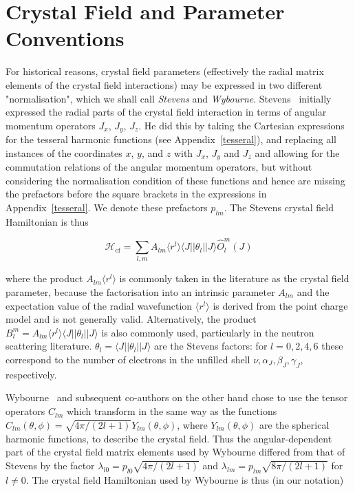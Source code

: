 \section{Crystal Field and Parameter Conventions}\label{cfparconventions}

For historical reasons, crystal field parameters (effectively the radial matrix elements of the crystal field
interactions) may be expressed in two different "normalisation", which we shall call \emph{Stevens} and 
\emph{Wybourne}. Stevens~\cite{stevens52-209,hutchings64-227} initially expressed the radial parts of the crystal field interaction
in terms of angular momentum operators $J_x$, $J_y$, $J_z$. He did this by taking the Cartesian expressions for 
the tesseral harmonic functions (see Appendix~\ref{tesseral}), and replacing all instances of the coordinates
$x$, $y$, and $z$ with $J_x$, $J_y$ and $J_z$ and allowing for the commutation relations of the angular
momentum operators, but without considering the normalisation condition of these functions and hence are missing
the prefactors before the square brackets in the expressions in Appendix~\ref{tesseral}. We denote these
prefactors $p_{lm}$. The Stevens crystal field Hamiltonian is thus

\[
\mathcal{H}_{\mathrm{cf}} = \sum_{l,m} A_{lm} \langle r^l \rangle \langle J || \theta_l || J \rangle \hat{O}_l^m (J)
\]

\noindent where the product $A_{lm} \langle r^l \rangle$ is commonly taken in the literature as the crystal
field parameter, because the factorisation into an intrinsic parameter $A_{lm}$ and the expectation value of
the radial wavefunction $\langle r^l \rangle$ is derived from the point charge model and is not generally
valid. Alternatively, 
the product $B_l^m = A_{lm} \langle r^l \rangle \langle J || \theta_l || J \rangle$ is
also commonly used, particularly in the neutron scattering literature. 
$ \theta_l= \langle J || \theta_l || J \rangle$ are the Stevens 
factors:  for $l=0,2,4,6$ these correspond to the number of electrons 
in the unfilled shell $\nu,\alpha_J,\beta_J,\gamma_J$, respectively.

Wybourne~\cite{wybourne65} and subsequent co-authors on the other hand chose to use the tensor operators 
$\hat{C}_{lm}$ which transform in the same way as the functions $C_{lm}(\theta,\phi) = \sqrt{4\pi / (2l+1)}
Y_{lm}(\theta,\phi)$, where $Y_{lm}(\theta,\phi)$ are the spherical harmonic functions, to describe the crystal
field. Thus the angular-dependent part of the crystal field matrix elements used by Wybourne differed from
that of Stevens by the factor $\lambda_{l0} = p_{l0} \sqrt{4\pi / (2l+1)}$ and
 $\lambda_{lm} = p_{lm} \sqrt{8\pi / (2l+1)}$ for $l\neq 0$. The crystal field Hamiltonian used by Wybourne is
thus (in our notation)

